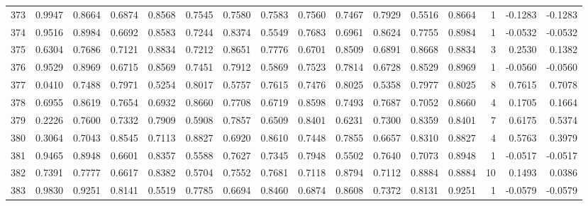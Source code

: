 \begin{tabular}{lrrrrrrrrrrrrrrr}
373 &      0.9947 &  0.8664 &  0.6874 &  0.8568 &  0.7545 &  0.7580 &  0.7583 &  0.7560 &  0.7467 &  0.7929 &   0.5516 &     0.8664 &      1 &                   -0.1283 &                    -0.1283 \\
374 &      0.9516 &  0.8984 &  0.6692 &  0.8583 &  0.7244 &  0.8374 &  0.5549 &  0.7683 &  0.6961 &  0.8624 &   0.7755 &     0.8984 &      1 &                   -0.0532 &                    -0.0532 \\
375 &      0.6304 &  0.7686 &  0.7121 &  0.8834 &  0.7212 &  0.8651 &  0.7776 &  0.6701 &  0.8509 &  0.6891 &   0.8668 &     0.8834 &      3 &                    0.2530 &                     0.1382 \\
376 &      0.9529 &  0.8969 &  0.6715 &  0.8569 &  0.7451 &  0.7912 &  0.5869 &  0.7523 &  0.7814 &  0.6728 &   0.8529 &     0.8969 &      1 &                   -0.0560 &                    -0.0560 \\
377 &      0.0410 &  0.7488 &  0.7971 &  0.5254 &  0.8017 &  0.5757 &  0.7615 &  0.7476 &  0.8025 &  0.5358 &   0.7977 &     0.8025 &      8 &                    0.7615 &                     0.7078 \\
378 &      0.6955 &  0.8619 &  0.7654 &  0.6932 &  0.8660 &  0.7708 &  0.6719 &  0.8598 &  0.7493 &  0.7687 &   0.7052 &     0.8660 &      4 &                    0.1705 &                     0.1664 \\
379 &      0.2226 &  0.7600 &  0.7332 &  0.7909 &  0.5908 &  0.7857 &  0.6509 &  0.8401 &  0.6231 &  0.7300 &   0.8359 &     0.8401 &      7 &                    0.6175 &                     0.5374 \\
380 &      0.3064 &  0.7043 &  0.8545 &  0.7113 &  0.8827 &  0.6920 &  0.8610 &  0.7448 &  0.7855 &  0.6657 &   0.8310 &     0.8827 &      4 &                    0.5763 &                     0.3979 \\
381 &      0.9465 &  0.8948 &  0.6601 &  0.8357 &  0.5588 &  0.7627 &  0.7345 &  0.7948 &  0.5502 &  0.7640 &   0.7073 &     0.8948 &      1 &                   -0.0517 &                    -0.0517 \\
382 &      0.7391 &  0.7777 &  0.6617 &  0.8382 &  0.5704 &  0.7552 &  0.7681 &  0.7118 &  0.8794 &  0.7112 &   0.8884 &     0.8884 &     10 &                    0.1493 &                     0.0386 \\
383 &      0.9830 &  0.9251 &  0.8141 &  0.5519 &  0.7785 &  0.6694 &  0.8460 &  0.6874 &  0.8608 &  0.7372 &   0.8131 &     0.9251 &      1 &                   -0.0579 &                    -0.0579 \\

\end{tabular}
